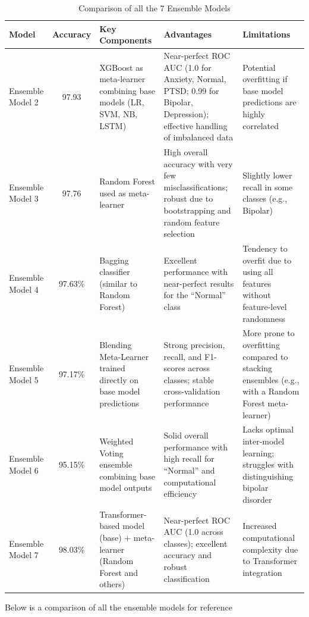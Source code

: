 \begin{table}[H]
    \centering
    \caption*{Comparison of all the 7 Ensemble Models}
    \label{tab:ensemble_comparison}
    \begin{tabularx}{\textwidth}{|l|c|X|X|X|}
    \hline
    \textbf{Model} & \textbf{Accuracy} & \textbf{Key Components} & \textbf{Advantages} & \textbf{Limitations} \\
    \hline
    Ensemble Model 2 & 97.93 & XGBoost as meta-learner combining base models (LR, SVM, NB, LSTM) & Near-perfect ROC AUC (1.0 for Anxiety, Normal, PTSD; 0.99 for Bipolar, Depression); effective handling of imbalanced data & Potential overfitting if base model predictions are highly correlated \\
    \hline
    Ensemble Model 3 & 97.76 & Random Forest used as meta-learner & High overall accuracy with very few misclassifications; robust due to bootstrapping and random feature selection & Slightly lower recall in some classes (e.g., Bipolar) \\
    \hline
    Ensemble Model 4 & 97.63\% & Bagging classifier (similar to Random Forest) & Excellent performance with near-perfect results for the “Normal” class & Tendency to overfit due to using all features without feature-level randomness \\
    \hline
    Ensemble Model 5 & 97.17\% & Blending Meta-Learner trained directly on base model predictions & Strong precision, recall, and F1-scores across classes; stable cross-validation performance & More prone to overfitting compared to stacking ensembles (e.g., with a Random Forest meta-learner) \\
    \hline
    Ensemble Model 6 & 95.15\% & Weighted Voting ensemble combining base model outputs & Solid overall performance with high recall for “Normal” and computational efficiency & Lacks optimal inter-model learning; struggles with distinguishing bipolar disorder \\
    \hline
    Ensemble Model 7 & 98.03\% & Transformer-based model (base) + meta-learner (Random Forest and others) & Near-perfect ROC AUC (1.0 across classes); excellent accuracy and robust classification & Increased computational complexity due to Transformer integration \\
    \hline
    \end{tabularx}
\end{table}


\pagebreak

\noindent
Below is a comparison of all the ensemble models for reference

